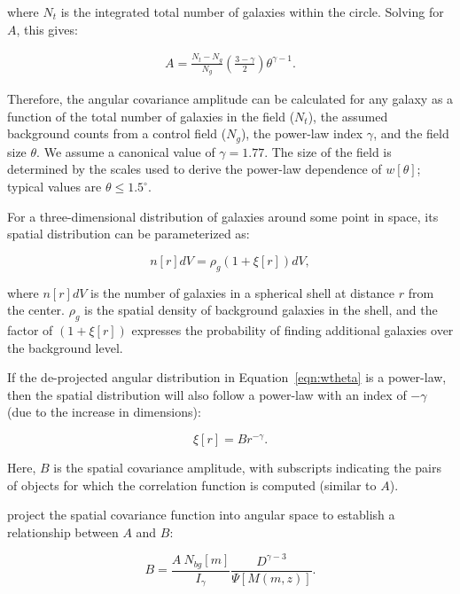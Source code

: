 \documentclass{emulateapj}
\begin{document}
\noindent where $N_t$ is the integrated total number of galaxies within the circle. Solving for $A$, this gives:

\begin{eqnarray}
A = \frac{N_t - N_g}{N_g} \left(\frac{3-\gamma}{2}\right) \theta^{\gamma-1}.
\end{eqnarray}

Therefore, the angular covariance amplitude can be calculated for any galaxy as a function of the total number of galaxies in the field ($N_t$), the assumed background counts from a control field ($N_g$), the power-law index $\gamma$, and the field size $\theta$. We assume a canonical value of $\gamma=1.77$. The size of the field is determined by the scales used to derive the power-law dependence of $w[\theta]$; typical values are $\theta\leq1.5^\circ$. 

For a three-dimensional distribution of galaxies around some point in space, its spatial distribution can be parameterized as:

\begin{equation}
n[r]dV = \rho_g (1 + \xi[r]) dV,
\end{equation}

\noindent where $n[r]dV$ is the number of galaxies in a spherical shell at distance $r$ from the center. $\rho_g$ is the spatial density of background galaxies in the shell, and the factor of $(1+\xi[r])$ expresses the probability of finding additional galaxies over the background level. 

If the de-projected angular distribution in Equation~\ref{eqn:wtheta} is a power-law, then the spatial distribution will also follow a power-law with an index of $-\gamma$ (due to the increase in dimensions):

\begin{equation}
\xi[r] = Br^{-\gamma}.
\end{equation}

\noindent Here, $B$ is the spatial covariance amplitude, with subscripts indicating the pairs of objects for which the correlation function is computed (similar to $A$). 

\citet{lon79} project the spatial covariance function into angular space to establish a relationship between $A$ and $B$: 

\begin{equation}
\label{eqn:atob}
B = \frac{A~N_{bg}[m]}{I_\gamma} \frac{D^{\gamma-3}}{\Psi[M(m,z)]}.
\end{equation}
\end{document}
